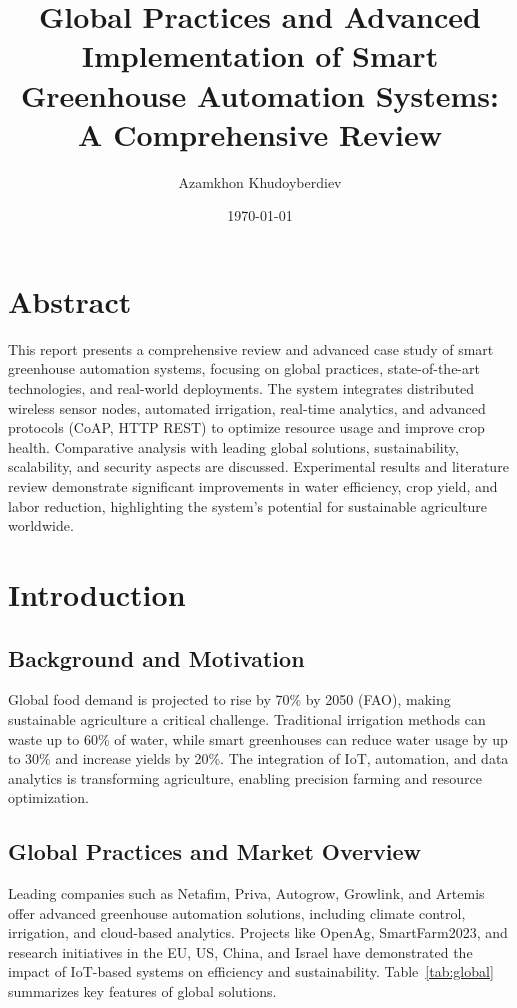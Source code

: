 \documentclass[12pt,a4paper]{article}
\title{Global Practices and Advanced Implementation of Smart Greenhouse Automation Systems: A Comprehensive Review}
\author{Azamkhon Khudoyberdiev}
\date{\today}
\begin{document}
\maketitle
\newpage
\tableofcontents
\newpage


\section*{Abstract}
This report presents a comprehensive review and advanced case study of smart greenhouse automation systems, focusing on global practices, state-of-the-art technologies, and real-world deployments. The system integrates distributed wireless sensor nodes, automated irrigation, real-time analytics, and advanced protocols (CoAP, HTTP REST) to optimize resource usage and improve crop health. Comparative analysis with leading global solutions, sustainability, scalability, and security aspects are discussed. Experimental results and literature review demonstrate significant improvements in water efficiency, crop yield, and labor reduction, highlighting the system’s potential for sustainable agriculture worldwide.

\section{Introduction}
\subsection{Background and Motivation}
Global food demand is projected to rise by 70\% by 2050 (FAO), making sustainable agriculture a critical challenge. Traditional irrigation methods can waste up to 60\% of water, while smart greenhouses can reduce water usage by up to 30\% and increase yields by 20\%. The integration of IoT, automation, and data analytics is transforming agriculture, enabling precision farming and resource optimization.

\subsection{Global Practices and Market Overview}
Leading companies such as Netafim, Priva, Autogrow, Growlink, and Artemis offer advanced greenhouse automation solutions, including climate control, irrigation, and cloud-based analytics. Projects like OpenAg, SmartFarm2023, and research initiatives in the EU, US, China, and Israel have demonstrated the impact of IoT-based systems on efficiency and sustainability. Table~\ref{tab:global} summarizes key features of global solutions.
\end{document}
